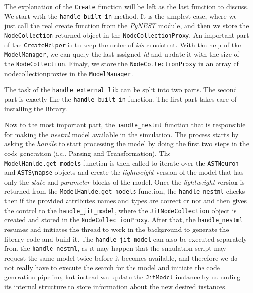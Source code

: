 The explanation of the \texttt{Create} function will be left as the last function to discuss. We start with the \texttt{handle\_built\_in} method. It is the simplest case, where we just call the real create function from the \emph{PyNEST} module, and then we store the \texttt{NodeCollection} returned object in the \texttt{NodeCollectionProxy}. An important part of the \texttt{CreateHelper} is to keep the order of \emph{ids} consistent. With the help of the \texttt{ModelManager}, we can query the last assigned \emph{id} and update it with the size of the \texttt{NodeCollection}. Finaly, we store the \texttt{NodeCollectionProxy} in an array of nodecollectionproxies in the \texttt{ModelManager}.

The task of the \texttt{handle\_external\_lib} can be split into two parts. The second part is exactly like the \texttt{handle\_built\_in} function. The first part takes care of installing the library.

Now to the most important part, the \texttt{handle\_nestml} function that is responsible for making the \emph{nestml} model available in the simulation. The process starts by asking the \emph{handle} to start processing the model by doing the first two steps in the code generation (i.e., Parsing and Transformation). The \texttt{ModelHanlde.get\_models} function is then called to iterate over the \texttt{ASTNeuron} and \texttt{ASTSynapse} objects and create the \emph{lightweight} version of the model that has only the \emph{state} and \emph{parameter} blocks of the model. Once the \emph{lightweight} version is returned from the  \texttt{ModelHanlde.get\_models} function, the \texttt{handle\_nestml} checks then if the provided attributes names and types are correct or not and then gives the control to the \texttt{handle\_jit\_model}, where the \texttt{JitNodeCollection} object is created and stored in the \texttt{NodeCollectionProxy}. After that, the  \texttt{handle\_nestml} resumes and initiates the thread to work in the background to generate the library code and build it. The  \texttt{handle\_jit\_model} can also be executed separately from the  \texttt{handle\_nestml}, as it may happen that the simulation script may request the same model twice before it becomes available, and therefore we do not really have to execute the search for the model and initiate the code generation pipeline, but instead we update the \texttt{JitModel} instance by extending its internal structure to store information about the new desired instances.


